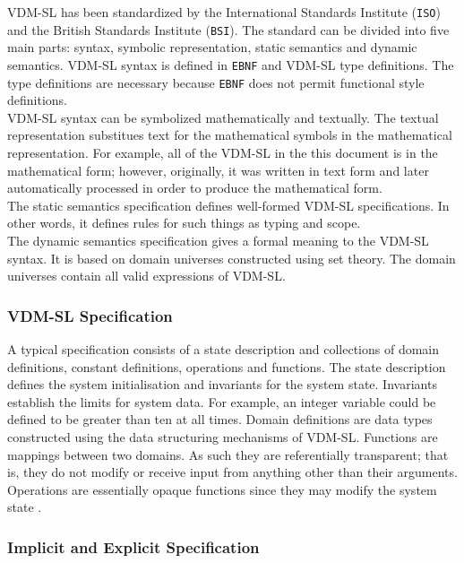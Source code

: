 \documentclass[11pt]{article}
\begin{document}
VDM-SL has been standardized by the International Standards Institute ({\tt ISO}) and the British Standards Institute ({\tt BSI}).  The standard can be divided into five main parts: syntax, symbolic representation, static semantics and dynamic semantics.  VDM-SL syntax is defined in {\tt EBNF} and VDM-SL type definitions.  The type definitions are necessary because {\tt EBNF} does not permit functional style definitions. \\

VDM-SL syntax can be symbolized mathematically and textually.  The textual representation substitues text for the mathematical symbols in the mathematical representation.  For example, all of the VDM-SL in the this document is in the mathematical form; however, originally, it was written in text form and later automatically processed in order to produce the mathematical form.\\

The static semantics specification defines well-formed VDM-SL specifications.  In other words, it defines rules for such things as typing and scope.\\

The dynamic semantics specification gives a formal meaning to the VDM-SL syntax.  It is based on domain universes constructed using set theory.  The domain universes contain all valid expressions of VDM-SL. \\ \cite{PNLP}

\subsubsection{VDM-SL Specification}

A typical specification consists of a state description and collections of domain definitions, constant definitions, operations and functions.  The state description defines the system initialisation and invariants for the system state.  Invariants establish the limits for system data.  For example, an integer variable could be defined to be greater than ten at all times.  Domain definitions are data types constructed using the data structuring mechanisms of VDM-SL. Functions are mappings between two domains.  As such they are referentially transparent; that is, they do not modify or receive input from anything other than their arguments.  Operations are essentially opaque functions since they may modify the system state \cite{PNLP}.

\subsubsection{Implicit and Explicit Specification}  
\end{document}

